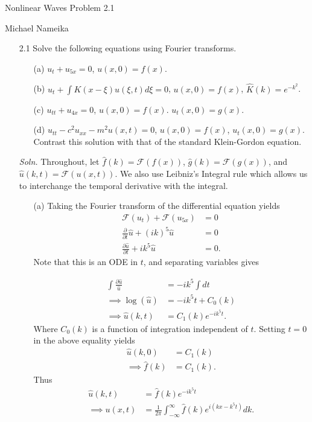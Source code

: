 \documentclass{article}
\begin{document}
\begin{center}
    {\huge Nonlinear Waves Problem 2.1}
    \vspace{0.5cm}

    {\large Michael Nameika}
\end{center}

\begin{itemize}
    \item[2.1] Solve the following equations using Fourier transforms.
    \begin{itemize}
        \item[(a)] $u_t + u_{5x} = 0$, $u(x,0) = f(x)$.

        \item[(b)] $u_t + \int K(x - \xi)u(\xi,t)d\xi = 0$, $u(x,0) = f(x)$, $\hat{K}(k) = e^{-k^2}$.

        \item[(c)] $u_{tt} + u_{4x} = 0$, $u(x,0) = f(x)$. $u_t(x,0) = g(x)$.

        \item[(d)] $u_{tt} - c^2u_{xx} - m^2u(x,t) = 0$, $u(x,0) = f(x)$, $u_t(x,0) = g(x)$. Contrast this solution with that of the standard Klein-Gordon equation.
    \end{itemize}
    \textit{Soln.} Throughout, let $\hat{f}(k) = \mathcal{F}(f(x))$, $\hat{g}(k) = \mathcal{F}(g(x))$, and $\hat{u}(k,t) = \mathcal{F}(u(x,t))$. We also use Leibniz's Integral rule which allows us to interchange the temporal derivative with the integral.
    \begin{itemize}
        \item[(a)] Taking the Fourier transform of the differential equation yields
        \begin{align*}
            \mathcal{F}(u_t) + \mathcal{F}(u_{5x}) &= 0\\
            \frac{\partial }{\partial t}\hat{u} + (ik)^5\hat{u} &= 0\\
            \frac{\partial \hat{u}}{\partial t} + ik^5\hat{u} &= 0.
        \end{align*}
        Note that this is an ODE in $t$, and separating variables gives

        \begin{align*}
            \int\frac{\partial \hat{u}}{\hat{u}} &= -ik^5\int dt\\
            \implies \log(\hat{u}) &= -ik^5t + C_0(k)\\
            \implies \hat{u}(k,t) &= C_1(k)e^{-ik^5t}.
        \end{align*}
        Where $C_0(k)$ is a function of integration independent of $t$. Setting $t = 0$ in the above equality yields
        \begin{align*}
            \hat{u}(k,0) &= C_1(k)\\
            \implies \hat{f}(k) &= C_1(k).
        \end{align*}
        Thus
        \begin{align*}
            \hat{u}(k,t) &= \hat{f}(k)e^{-ik^5t}\\
            \implies u(x,t) &= \frac{1}{2\pi}\int_{-\infty}^{\infty} \hat{f}(k)e^{i(kx - k^5t)}dk.
        \end{align*}



\end{itemize}
\end{itemize}
\end{document}
